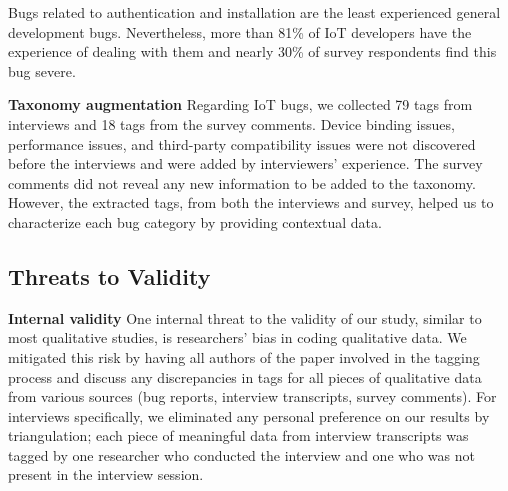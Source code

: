 Bugs related to authentication and installation are the least experienced general development bugs. Nevertheless, more than 81\% of IoT developers have the experience of dealing with them and nearly 30\% of survey respondents find this bug severe.


 \begin{table}%
\caption{Survey Results: Bug Taxonomy}
\label{tab2}
\end{table}

\textbf{Taxonomy augmentation}
Regarding IoT bugs, we collected 79 tags from interviews and 18 tags from the survey comments. Device binding issues, performance issues, and third-party compatibility issues were not discovered before the interviews and were added by interviewers' experience. The survey comments did not reveal any new information to be added to the taxonomy. However, the extracted tags, from both the interviews and survey, helped us to characterize each bug category by providing contextual data.


\subsection{Threats to Validity}
\textbf{Internal validity}
One internal threat to the validity of our study, similar to most qualitative studies, is researchers' bias in coding qualitative data. We mitigated this risk by having all authors of the paper involved in the tagging process and discuss any discrepancies in tags for all pieces of qualitative data from various sources (bug reports, interview transcripts, survey comments). For interviews specifically, we eliminated any personal preference on our results by triangulation; each piece of meaningful data from interview transcripts was tagged by one researcher who conducted the interview and one who was not present in the interview session.

